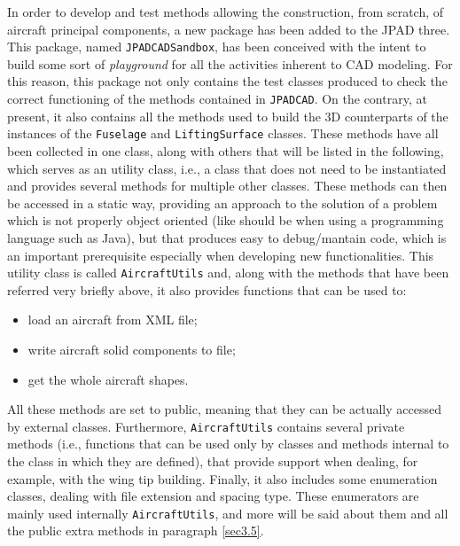 In order to develop and test methods allowing the construction, from scratch, of aircraft principal components, a new package has been added to the \gls{JPAD} three. This package, named \lstinline[language=Java]!JPADCADSandbox!, has been conceived with the intent to build some sort of \emph{playground} for all the activities inherent to \gls{CAD} modeling. For this reason, this package not only contains the test classes produced to check the correct functioning of the methods contained in \lstinline[language=Java]!JPADCAD!. On the contrary, at present, it also contains all the methods used to build the 3D counterparts of the instances of the \lstinline[language=Java]!Fuselage! and \lstinline[language=Java]!LiftingSurface! classes. These methods have all been collected in one class, along with others that will be listed in the following, which serves as an utility class, i.e., a class that does not need to be instantiated and provides several methods for multiple other classes. These methods can then be accessed in a static way, providing an approach to the solution of a problem which is not properly object oriented (like should be when using a programming language such as Java), but that produces easy to debug/mantain code, which is an important prerequisite especially when developing new functionalities. This utility class is called \lstinline[language=Java]!AircraftUtils! and, along with the methods that have been referred very briefly above, it also provides functions that can be used to:
%
\begin{itemize}
\item load an aircraft from XML file;
\item write aircraft solid components to file;
\item get the whole aircraft shapes.
\end{itemize}
%
All these methods are set to public, meaning that they can be actually accessed by external classes. Furthermore, \lstinline[language=Java]!AircraftUtils! contains several private methods (i.e., functions that can be used only by classes and methods internal to the class in which they are defined), that provide support when dealing, for example, with the wing tip building. Finally, it also includes some enumeration classes, dealing with file extension and spacing type. These enumerators are mainly used internally \lstinline[language=Java]!AircraftUtils!, and more will be said about them and all the public extra methods in paragraph \ref{sec3.5}. 

